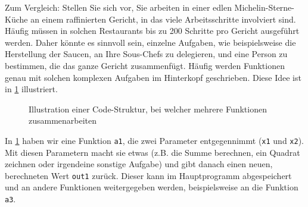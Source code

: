 Zum Vergleich: Stellen Sie sich vor, Sie arbeiten in einer edlen Michelin-Sterne-Küche an einem raffinierten Gericht, in das viele Arbeitsschritte involviert sind. Häufig müssen in solchen Restaurants bis zu 200 Schritte pro Gericht ausgeführt werden. Daher könnte es sinnvoll sein, einzelne Aufgaben, wie beispielsweise die Herstellung der Saucen, an Ihre Sous-Chefs zu delegieren, und eine Person zu bestimmen, die das ganze Gericht zusammenfügt. Häufig werden Funktionen genau mit solchen komplexen Aufgaben im Hinterkopf geschrieben. Diese Idee ist in \cref{fig:funktionen-mehrere} illustriert.

\begin{figure}[H]
	\centering
	\caption{Illustration einer Code-Struktur, bei welcher mehrere Funktionen zusammenarbeiten}
	\label{fig:funktionen-mehrere}
\end{figure}

In \cref{fig:funktionen-mehrere} haben wir eine Funktion \lstinline|a1|, die zwei Parameter entgegennimmt (\lstinline|x1| und \lstinline|x2|). Mit diesen Parametern macht sie etwas (z.B. die Summe berechnen, ein Quadrat zeichnen oder irgendeine sonstige Aufgabe) und gibt danach einen neuen, berechneten Wert \lstinline|out1| zurück. Dieser kann im Hauptprogramm abgespeichert und an andere Funktionen weitergegeben werden, beispielsweise an die Funktion \lstinline|a3|.

